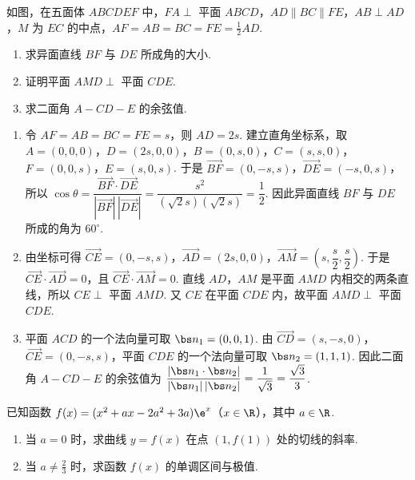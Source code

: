 \begin{problem}
如图，在五面体 \(ABCDEF\) 中，\(FA \perp\) 平面 \(ABCD\)，\(AD \parallel BC \parallel FE\)，\(AB \perp AD\)，\(M\) 为 \(EC\) 的中点，\(AF = AB = BC = FE = \frac{1}{2} AD\).

\begin{enumerate}
\item 求异面直线 \(BF\) 与 \(DE\) 所成角的大小.
\item 证明平面 \(AMD \perp\) 平面 \(CDE\).
\item 求二面角 \(A - CD - E\) 的余弦值.
\end{enumerate}

\end{problem}

\begin{solution}
\begin{enumerate}
\item 令 \(AF=AB=BC=FE=s\)，则 \(AD=2s\). 建立直角坐标系，取
\(A=(0,0,0)\)，\(D=(2s,0,0)\)，\(B=(0,s,0)\)，\(C=(s,s,0)\)，\(F=(0,0,s)\)，\(E=(s,0,s)\). 于是 \(\overrightarrow{BF}=(0,-s,s)\)，\(\overrightarrow{DE}=(-s,0,s)\)，所以
\(\cos\theta=\dfrac{\overrightarrow{BF}\cdot\overrightarrow{DE}}{|\overrightarrow{BF}|\,|\overrightarrow{DE}|}=\dfrac{s^2}{(\sqrt2s)(\sqrt2s)}=\dfrac12\).
因此异面直线 \(BF\) 与 \(DE\) 所成的角为 \(60^\circ\).
\item 由坐标可得 \(\overrightarrow{CE}=(0,-s,s)\)，\(\overrightarrow{AD}=(2s,0,0)\)，\(\overrightarrow{AM}=(s,\dfrac{s}{2},\dfrac{s}{2})\). 于是 \(\overrightarrow{CE}\cdot\overrightarrow{AD}=0\)，且 \(\overrightarrow{CE}\cdot\overrightarrow{AM}=0\). 直线 \(AD\)，\(AM\) 是平面 \(AMD\) 内相交的两条直线，所以 \(CE\perp\) 平面 \(AMD\). 又 \(CE\) 在平面 \(CDE\) 内，故平面 \(AMD\perp\) 平面 \(CDE\).
\item 平面 \(ACD\) 的一个法向量可取 \(\bs n_1=(0,0,1)\). 由 \(\overrightarrow{CD}=(s,-s,0)\)，\(\overrightarrow{CE}=(0,-s,s)\)，平面 \(CDE\) 的一个法向量可取 \(\bs n_2=(1,1,1)\). 因此二面角 \(A-CD-E\) 的余弦值为
\(\dfrac{|\bs n_1\cdot\bs n_2|}{|\bs n_1|\,|\bs n_2|}=\dfrac1{\sqrt3}=\dfrac{\sqrt3}{3}\).
\end{enumerate}
\end{solution}

\begin{problem}
已知函数 \(f(x) = (x^{2} + ax - 2a^{2} + 3a)\e^{x}\)（\(x \in \R\)），其中 \(a \in \R\).

\begin{enumerate}
\item 当 \(a = 0\) 时，求曲线 \(y = f(x)\) 在点 \((1, f(1))\) 处的切线的斜率.
\item 当 \(a \neq \frac{2}{3}\) 时，求函数 \(f(x)\) 的单调区间与极值.
\end{enumerate}
\end{problem}

